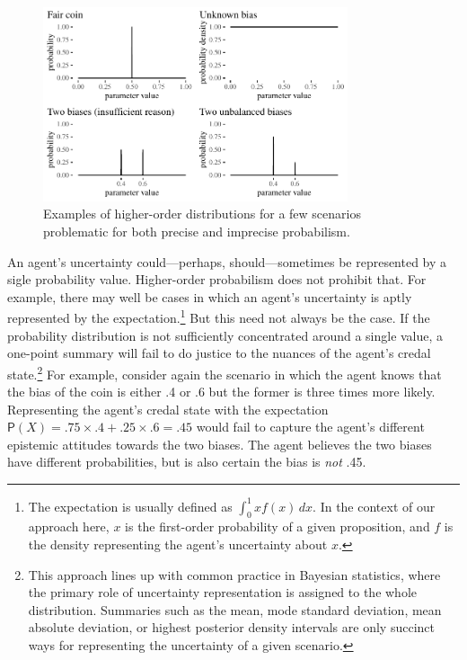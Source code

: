 \documentclass[
  letterpaper,
  DIV=11,
  numbers=noendperiod]{scrartcl}
\begin{document}
\begin{figure}[t]

{\centering \includegraphics[width=0.8\textwidth,height=\textheight]{imp_philosophical_files/figure-pdf/fig-evidenceResponse-1.pdf}

}

\caption{\label{fig-evidenceResponse}Examples of higher-order
distributions for a few scenarios problematic for both precise and
imprecise probabilism.}

\end{figure}

An agent's uncertainty could---perhaps, should---sometimes be
represented by a sigle probability value. Higher-order probabilism does
not prohibit that. For example, there may well be cases in which an
agent's uncertainty is aptly represented by the expectation.\footnote{The
  expectation is usually defined as \(\int_{0}^{1} x f(x) \, dx\). In
  the context of our approach here, \(x\) is the first-order probability
  of a given proposition, and \(f\) is the density representing the
  agent's uncertainty about \(x\).} But this need not always be the
case. If the probability distribution is not sufficiently concentrated
around a single value, a one-point summary will fail to do justice to
the nuances of the agent's credal state.\footnote{This approach lines up
  with common practice in Bayesian statistics, where the primary role of
  uncertainty representation is assigned to the whole distribution.
  Summaries such as the mean, mode standard deviation, mean absolute
  deviation, or highest posterior density intervals are only succinct
  ways for representing the uncertainty of a given scenario.} For
example, consider again the scenario in which the agent knows that the
bias of the coin is either .4 or .6 but the former is three times more
likely. Representing the agent's credal state with the expectation
\(\mathsf{P}(X) = .75 \times .4 + .25 \times .6 = .45\) would fail to
capture the agent's different epistemic attitudes towards the two
biases. The agent believes the two biases have different probabilities,
but is also certain the bias is \emph{not} .45.
\end{document}
